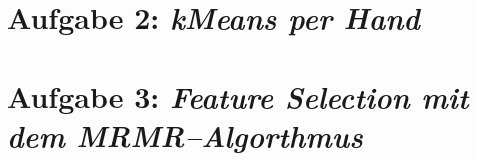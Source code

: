 \section*{Aufgabe 2: \emph{kMeans per Hand}}

\section*{Aufgabe 3: \emph{Feature Selection mit dem MRMR--Algorthmus}}
